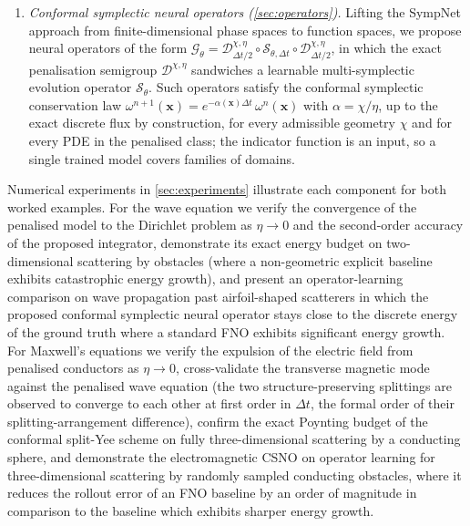 \documentclass[11pt]{article}
\theoremstyle{definition}
\theoremstyle{remark}
\newcommand{\bx}{\bm{x}}
\newcommand{\Do}{\mathcal{D}}
\newcommand{\So}{\mathcal{S}}
\newcommand{\Go}{\mathcal{G}}
\begin{document}
\begin{enumerate}[leftmargin=2em]
methods for the whole penalised class by Strang splitting. In our scheme the dissipative part of the flow is a pointwise linear ODE that can be integrated exactly, and the conservative part is treated by any multi-symplectic integrator.  A key result
(\cref{lem:dissipative-contraction}) shows that, under the
compatibility condition, the exact geometry-aware dissipative map contracts the symplectic density pointwise by exactly $e^{-\chi\tau/\eta}$.
Consequently, the composed schemes satisfy a discrete conformal
multi-symplectic conservation law (\cref{prop:discrete-law}) and
reproduce the correct local energy budget of the penalised equations.
\item \emph{Conformal symplectic neural operators
(\cref{sec:operators}).}
Lifting the SympNet approach \cite{jin2020sympnets} from finite-dimensional phase spaces to
function spaces, we propose neural operators of the form
$\Go_\theta = \Do^{\chi,\eta}_{\Delta t/2}\circ\So_{\theta,\Delta
t}\circ\Do^{\chi,\eta}_{\Delta t/2}$, in which the exact penalisation
semigroup $\Do^{\chi,\eta}$ sandwiches a learnable multi-symplectic
evolution operator $\So_\theta$.  Such operators satisfy the conformal
symplectic conservation law
$\omega^{n+1}(\bx)=e^{-\alpha(\bx)\Delta t}\,\omega^{n}(\bx)$ with
$\alpha=\chi/\eta$, up to the exact discrete flux by
construction, for every admissible geometry $\chi$ and for every PDE
in the penalised class; the indicator function is an input, so a
single trained model covers families of domains.
\end{enumerate}
Numerical experiments in \cref{sec:experiments} illustrate each
component for both worked examples.  For the wave equation we verify
the convergence of the penalised model to the Dirichlet problem as
$\eta\to0$ and the second-order accuracy of the proposed integrator,
demonstrate its exact energy budget on two-dimensional scattering by
obstacles (where a non-geometric explicit baseline exhibits
catastrophic energy growth), and present an operator-learning
comparison on wave propagation past airfoil-shaped scatterers in which
the proposed conformal symplectic neural operator stays close to the discrete
energy of the ground truth where a standard FNO exhibits significant energy growth. For Maxwell's equations we verify the
expulsion of the electric field from penalised conductors as
$\eta\to0$, cross-validate the transverse magnetic mode against the
penalised wave equation (the two structure-preserving splittings are
observed to converge to each other at first order in $\Delta t$, the
formal order of their splitting-arrangement difference), confirm the
exact Poynting budget of the conformal split-Yee scheme on fully
three-dimensional scattering by a conducting sphere, and demonstrate
the electromagnetic CSNO on operator learning for three-dimensional
scattering by randomly sampled conducting obstacles, where it reduces
the rollout error of an FNO baseline by an order of
magnitude in comparison to the baseline which exhibits sharper energy growth.
\end{document}
